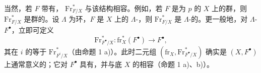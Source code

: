 当然，若 $F$ 带有， $\mathrm{Fr}_{F/X}^{*}$ 与该结构相容。例如，若 $F$ 是为 $p$ 的 $X$ 上的群，则 $\mathrm{Fr}_{F/X}^{*}$ 是群的。设 $\Lambda$ 为环，$F$ 是 $X$ 上的 $\Lambda$-，则 $\mathrm{Fr}_{F/X}^{*}$ 是 $\Lambda$-的。更一般地，对 $\Lambda$- $F^{\bullet}$，立即可定义
\[
\mathrm{Fr}_{F^{\bullet}/X}^{*}:\mathrm{fr}_X^*(F^{\bullet})\longrightarrow F^{\bullet},
\]
其在 $i$ 的等于 $\mathrm{Fr}_{F^i/X}^{*}$（由命题 1 a)）。此时二元组 $(\mathrm{fr}_X,\mathrm{Fr}_{F^{\bullet}/X}^{*})$ 确实是 $(X,F^{\bullet})$ 上通常意义的；它对 $F^{\bullet}$ 具有，并与底 $X$ 的相容（命题 1 a)、b)）。

